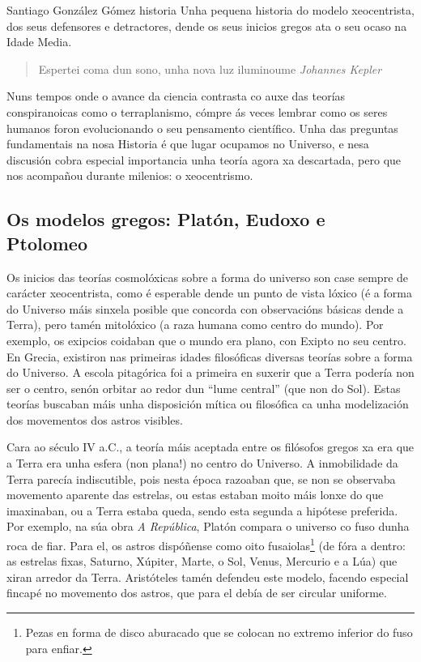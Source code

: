 \Titular*%
{A morte do xeocentrismo: dos gregos a Kepler}
{Santiago González Gómez}
{historia}
{Unha pequena historia do modelo xeocentrista, dos seus defensores e
detractores, dende os seus inicios gregos ata o seu ocaso na Idade Media.}


\begin{refsection}
\begin{multicols}{2}

\begin{quotation}
Espertei coma dun sono, unha nova luz iluminoume
\textit{Johannes Kepler}
\end{quotation}

Nuns tempos onde o avance da ciencia contrasta co auxe das teorías
conspiranoicas como o terraplanismo, cómpre ás veces lembrar como os seres
humanos foron evolucionando o seu pensamento científico. Unha das preguntas
fundamentais na nosa Historia é que lugar ocupamos no Universo, e nesa
discusión cobra especial importancia unha teoría agora xa descartada, pero que
nos acompañou durante milenios: o xeocentrismo.

\subsection*{Os modelos gregos: Platón, Eudoxo e \\ Ptolomeo}

Os inicios das teorías cosmolóxicas sobre a forma do universo son case sempre
de carácter xeocentrista, como é esperable dende un punto de vista lóxico (é a
forma do Universo máis sinxela posible que concorda con observacións básicas
dende a Terra), pero tamén mitolóxico (a raza humana como centro do mundo). Por
exemplo, os exipcios coidaban que o mundo era plano, con Exipto no seu centro.
En Grecia, existiron nas primeiras idades filosóficas diversas teorías sobre a
forma do Universo. A escola pitagórica foi a primeira en suxerir que a Terra
podería non ser o centro, senón orbitar ao redor dun ``lume central'' (que non
do Sol). Estas teorías buscaban máis unha disposición mítica ou filosófica ca
unha modelización dos movementos dos astros visibles.

Cara ao século IV a.C., a teoría máis aceptada entre os filósofos gregos xa era
que a Terra era unha esfera (non plana!) no centro do Universo. A inmobilidade
da Terra parecía indiscutible, pois nesta época razoaban que, se non se
observaba movemento aparente das estrelas, ou estas estaban moito máis lonxe do
que imaxinaban, ou a Terra estaba queda, sendo esta segunda a hipótese
preferida. Por exemplo, na súa obra \textit{A República}, Platón compara o
universo co fuso dunha roca de fiar. Para el, os astros dispóñense como oito
fusaiolas\footnote{Pezas en forma de disco aburacado que se colocan no extremo
inferior do fuso para enfiar.} (de fóra a dentro: as estrelas fixas, Saturno,
Xúpiter, Marte, o Sol, Venus, Mercurio e a Lúa) que xiran arredor da Terra.
Aristóteles tamén defendeu este modelo, facendo especial fincapé no movemento
dos astros, que para el debía de ser circular uniforme.


\end{multicols}
\end{refsection}
